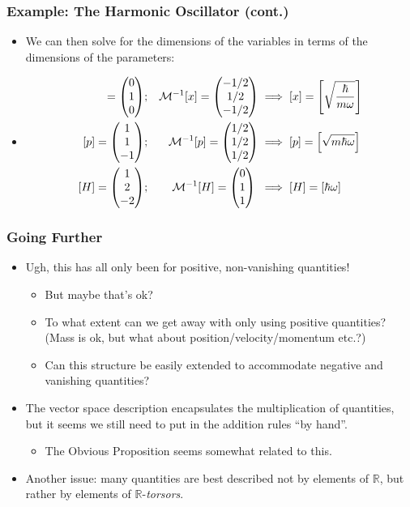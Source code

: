 \documentclass{beamer}
\begin{document}
\begin{frame}
    \frametitle{Example: The Harmonic Oscillator (cont.)}
    \begin{itemize}
        \item<1-> We can then solve for the dimensions of the variables in terms of the dimensions of the parameters:
        \item<2->
        \begin{align*}
            [x] = \mqty(0\\1\\0); && \mathcal{M}^{-1}[x] = \mqty(-1/2\\1/2\\-1/2) & \implies [x] = \left[\sqrt{\frac{\hbar}{m\omega}}\right] \\
            [p] = \mqty(1\\1\\-1); && \mathcal{M}^{-1}[p] = \mqty(1/2\\1/2\\1/2) & \implies [p] = \left[\sqrt{m\hbar\omega}\right] \\
            [H] = \mqty(1\\2\\-2); && \mathcal{M}^{-1}[H] = \mqty(0\\1\\1) \; & \implies [H] = \left[\hbar\omega\right]
        \end{align*}
    \end{itemize}
\end{frame}

\begin{frame}
    \frametitle{Going Further}
    \begin{itemize}
        \item<1-> Ugh, this has all only been for positive, non-vanishing quantities!
        \begin{itemize}
            \item<2-> But maybe that's ok?
            \item<3-> To what extent can we get away with only using positive quantities? (Mass is ok, but what about position/velocity/momentum etc.?)
            \item<4-> Can this structure be easily extended to accommodate negative and vanishing quantities?
        \end{itemize}
        \item<5-> The vector space description encapsulates the multiplication of quantities, but it seems we still need to put in the addition rules ``by hand''.
        \begin{itemize}
            \item<6-> The Obvious Proposition seems somewhat related to this.
        \end{itemize}
        \item<7-> Another issue: many quantities are best described not by elements of $\mathbb{R}$, but rather by elements of $\mathbb{R}$-\textit{torsors}.
    \end{itemize}
\end{frame}
\end{document}

